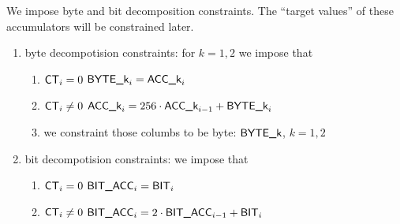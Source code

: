 We impose byte and bit decomposition constraints.
The ``target values'' of these accumulators will be constrained later.
\begin{enumerate}
    \item byte decompotision constraints: for $k = 1,2$ we impose that
        \begin{enumerate}
            \item \If $\textsf{CT}_{i} = 0$ \Then $\textsf{BYTE}\textsf{\_k}_{i} = \textsf{ACC}\textsf{\_k}_{i}$
            \item \If $\textsf{CT}_{i} \neq 0$  \Then $\textsf{ACC}\textsf{\_k}_{i} = 256 \cdot \textsf{ACC}\textsf{\_k}_{i-1} + \textsf{BYTE}\textsf{\_k}_{i}$
            \item we constraint those columbs to be byte: $\textsf{BYTE}\textsf{\_k}$, $k = 1,2$
        \end{enumerate}
    \item bit decompotision constraints: we impose that
        \begin{enumerate}
            \item \If $\textsf{CT}_{i} = 0$ \Then $\textsf{BIT}\textsf{\_}\textsf{ACC}_{i} = \textsf{BIT}_{i}$
            \item \If $\textsf{CT}_{i} \neq 0$  \Then $\textsf{BIT}\textsf{\_}\textsf{ACC}_{i} = 2 \cdot \textsf{BIT}\textsf{\_}\textsf{ACC}_{i-1} + \textsf{BIT}_{i}$
        \end{enumerate}
\end{enumerate}
